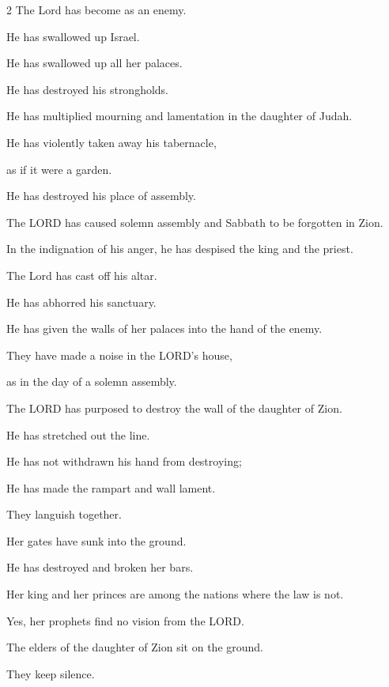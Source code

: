 \begin{multicols}{2}
	\myverse{}The Lord has become as an enemy.
	
	He has swallowed up Israel.
	
	He has swallowed up all her palaces.
	
	He has destroyed his strongholds.
	
	He has multiplied mourning and lamentation in the daughter of Judah.
	\vspace{\baselineskip}
	
	\myverse{}He has violently taken away his tabernacle,
	
	as if it were a garden.
	
	He has destroyed his place of assembly.
	
	The LORD has caused solemn assembly and Sabbath to be forgotten in Zion.
	
	In the indignation of his anger, he has despised the king and the priest.
	\vspace{\baselineskip}
	
	\myverse{}The Lord has cast off his altar.
	
	He has abhorred his sanctuary.
	
	He has given the walls of her palaces into the hand of the enemy.
	
	They have made a noise in the LORD’s house,
	
	as in the day of a solemn assembly.
	\vspace{\baselineskip}
	
	\myverse{}The LORD has purposed to destroy the wall of the daughter of Zion.
	
	He has stretched out the line.
	
	He has not withdrawn his hand from destroying;
	
	He has made the rampart and wall lament.
	
	They languish together.
	\vspace{\baselineskip}
	
	\myverse{}Her gates have sunk into the ground.
	
	He has destroyed and broken her bars.
	
	Her king and her princes are among the nations where the law is not.
	
	Yes, her prophets find no vision from the LORD.
	\vspace{\baselineskip}
	
	\myverse{}The elders of the daughter of Zion sit on the ground.
	
	They keep silence.
	

\end{multicols}
